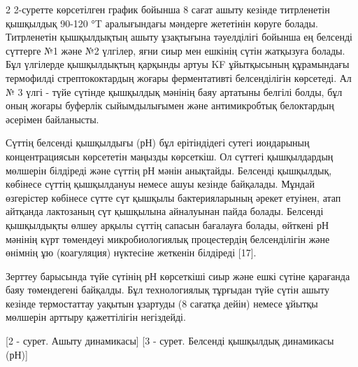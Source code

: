 \begin{multicols}{2}
2-суретте көрсетілген график бойынша 8 сағат ашыту кезінде титрленетін
қышқылдық 90-120 °T аралығындағы мәндерге жететінін көруге болады.
Титрленетін қышқылдықтың ашыту ұзақтығына тәуелділігі бойынша ең
белсенді сүттерге №1 және №2 үлгілер, яғни сиыр мен ешкінің сүтін
жатқызуға болады. Бұл үлгілерде қышқылдықтың қарқынды артуы KF
ұйытқысының құрамындағы термофилді стрептококтардың жоғары ферментативті
белсенділігін көрсетеді. Ал № 3 үлгі - түйе сүтінде қышқылдық мәнінің
баяу артатыны белгілі болды, бұл оның жоғары буферлік сыйымдылығымен
және антимикробтық белоктардың әсерімен байланысты.

Сүттің белсенді қышқылдығы (рН) бұл ерітіндідегі сутегі иондарының
концентрациясын көрсететін маңызды көрсеткіш. Ол сүттегі қышқылдардың
мөлшерін білдіреді және сүттің рН мәнін анықтайды. Белсенді қышқылдық,
көбінесе сүттің қышқылдануы немесе ашуы кезінде байқалады. Мұндай
өзгерістер көбінесе сүтте сүт қышқылы бактерияларының әрекет етуінен,
атап айтқанда лактозаның сүт қышқылына айналуынан пайда болады. Белсенді
қышқылдықты өлшеу арқылы сүттің сапасын бағалауға болады, өйткені рН
мәнінің күрт төмендеуі микробиологиялық процестердің белсенділігін және
өнімнің ұю (коагуляция) нүктесіне жеткенін білдіреді {[}17{]}.

Зерттеу барысында түйе сүтінің рН көрсеткіші сиыр және ешкі сүтіне
қарағанда баяу төмендегені байқалды. Бұл технологиялық тұрғыдан түйе
сүтін ашыту кезінде термостаттау уақытын ұзартуды (8 сағатқа дейін)
немесе ұйытқы мөлшерін арттыру қажеттілігін негіздейді.
\end{multicols}

[2 - сурет. Ашыту динамикасы]
[3 - сурет. Белсенді қышқылдық динамикасы (рН)]


